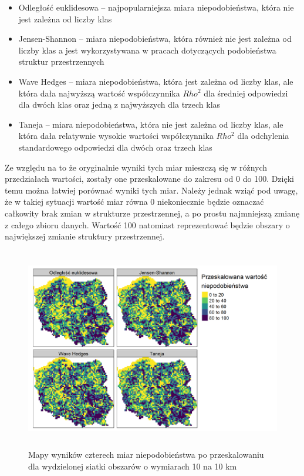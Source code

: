 \documentclass{amuthesis}
\begin{document}
\begin{itemize}
\tightlist
\item
  Odległość euklidesowa -- najpopularniejsza miara niepodobieństwa,
  która nie jest zależna od liczby klas
\item
  Jensen-Shannon -- miara niepodobieństwa, która również nie jest
  zależna od liczby klas a jest wykorzystywana w pracach dotyczących
  podobieństwa struktur przestrzennych
  \autocite{Jasiewicz_gigacells,niesterowicz2016,niesterowicz_regionalization,Briseno2024}
\item
  Wave Hedges -- miara niepodobieństwa, która jest zależna od liczby
  klas, ale która dała najwyższą wartość współczynnika \(Rho^2\) dla
  średniej odpowiedzi dla dwóch klas oraz jedną z najwyższych dla trzech
  klas
\item
  Taneja -- miara niepodobieństwa, która nie jest zależna od liczby
  klas, ale która dała relatywnie wysokie wartości współczynnika
  \(Rho^2\) dla odchylenia standardowego odpowiedzi dla dwóch oraz
  trzech klas
\end{itemize}

Ze względu na to że oryginalnie wyniki tych miar mieszczą się w różnych
przedziałach wartości, zostały one przeskalowane do zakresu od 0 do 100.
Dzięki temu można łatwiej porównać wyniki tych miar. Należy jednak wziąć
pod uwagę, że w takiej sytuacji wartość miar równa 0 niekoniecznie
będzie oznaczać całkowity brak zmian w strukturze przestrzennej, a po
prostu najmniejszą zmianę z całego zbioru danych. Wartość 100 natomiast
reprezentować będzie obszary o największej zmianie struktury
przestrzennej.

\begin{figure}[t]

{\centering \includegraphics[width=5.20833in,height=3.46875in]{figures/zestawienie_miar1.png}

}

\caption{\label{fig-zestawienie_miar1}Mapy wyników czterech miar
niepodobieństwa po przeskalowaniu dla wydzielonej siatki obszarów o
wymiarach 10 na 10 km}

\end{figure}
\end{document}
